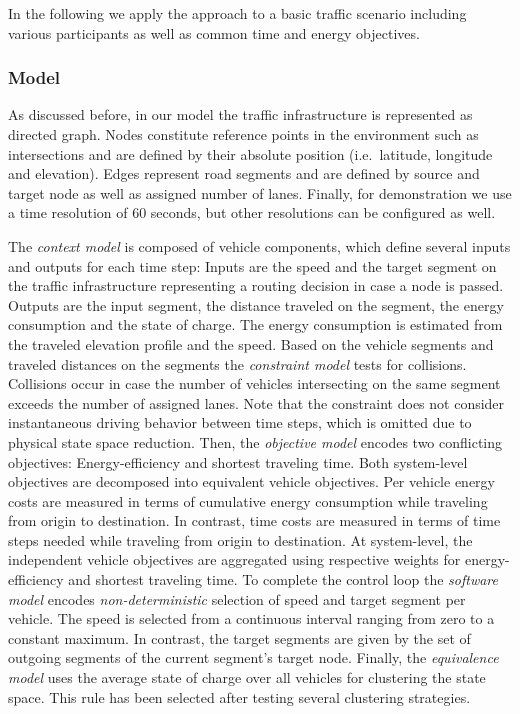 \documentclass[conference]{../cls/IEEEtran}
\begin{document}
In the following we apply the approach to a basic traffic scenario including various participants as well as common time and energy objectives.

\subsubsection*{Model}

As discussed before, in our model the traffic infrastructure is represented as directed graph. Nodes constitute reference points in the environment such as intersections and are defined by their absolute position (i.e.\ latitude, longitude and elevation). Edges represent road segments and are defined by source and target node as well as assigned number of lanes. Finally, for demonstration we use a time resolution of 60 seconds, but other resolutions can be configured as well.

The \textit{context model} is composed of vehicle components, which define several inputs and outputs for each time step: Inputs are the speed and the target segment on the traffic infrastructure representing a routing decision in case a node is passed. Outputs are the input segment, the distance traveled on the segment, the energy consumption and the state of charge. The energy consumption is estimated from the traveled elevation profile and the speed. Based on the vehicle segments and traveled distances on the segments the \textit{constraint model} tests for collisions. Collisions occur in case the number of vehicles intersecting on the same segment exceeds the number of assigned lanes. Note that the constraint does not consider instantaneous driving behavior between time steps, which is omitted due to physical state space reduction. Then, the \textit{objective model} encodes two conflicting objectives: Energy-efficiency and shortest traveling time. Both system-level objectives are decomposed into equivalent vehicle objectives. Per vehicle energy costs are measured in terms of cumulative energy consumption while traveling from origin to destination. In contrast, time costs are measured in terms of time steps needed while traveling from origin to destination. At system-level, the independent vehicle objectives are aggregated using respective weights for energy-efficiency and shortest traveling time. To complete the control loop the \textit{software model} encodes \textit{non-deterministic} selection of speed and target segment per vehicle. The speed is selected from a continuous interval ranging from zero to a constant maximum. In contrast, the target segments are given by the set of outgoing segments of the current segment's target node. Finally, the \textit{equivalence model} uses the average state of charge over all vehicles for clustering the state space. This rule has been selected after testing several clustering strategies.
\end{document}
